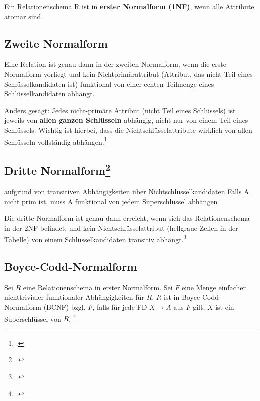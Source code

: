 \documentclass{lehramt-informatik-haupt}
\begin{document}
Ein Relationenschema R ist in \textbf{erster Normalform (1NF)}, wenn
alle Attribute atomar sind.

%

\subsection{Zweite Normalform}

Eine Relation ist genau dann in der zweiten Normalform, wenn die erste
Normalform vorliegt und kein Nichtprimärattribut (Attribut, das nicht
Teil eines Schlüsselkandidaten ist) funktional von einer echten
Teilmenge eines Schlüsselkandidaten abhängt.

Anders gesagt: Jedes nicht-primäre Attribut (nicht Teil eines
Schlüssels) ist jeweils von \textbf{allen ganzen Schlüsseln} abhängig,
nicht nur von einem Teil eines Schlüssels. Wichtig ist hierbei, dass die
Nichtschlüsselattribute wirklich von allen Schlüsseln vollständig
abhängen.\footcite[Zweite Normalform (2NF)]{wiki:normalisierung}

%

\subsection{Dritte Normalform\footcite[Seite 201]{winter}}

aufgrund von transitiven Abhängigkeiten über Nichtschlüsselkandidaten
Falls A nicht prim ist, muss A funktional von jedem Superschlüssel
abhängen

Die dritte Normalform ist genau dann erreicht, wenn sich das
Relationenschema in der 2NF befindet, und kein Nichtschlüsselattribut
(hellgraue Zellen in der Tabelle) von einem Schlüsselkandidaten
transitiv abhängt.\footcite[Dritte Normalform (3NF)]{wiki:normalisierung}

%

\subsection{Boyce-Codd-Normalform}

Sei $R$ eine Relationenschema in erster Normalform. Sei $F$ eine Menge
einfacher nichttrivialer funktionaler Abhängigkeiten für $R$. $R$ ist in
Boyce-Codd-Normalform (BCNF) bzgl. $F$, falls für jede FD $X \rightarrow
A$ aus $F$ gilt: $X$ ist ein Superschlüssel von $R$.
\footcite[Boyce-Codd-Normalform (BCNF)]{wiki:normalisierung}
\end{document}

